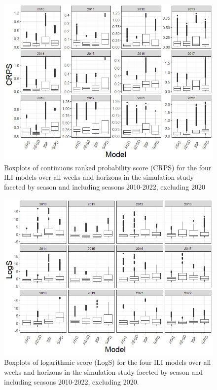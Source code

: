 \documentclass[ba]{imsart}
\theoremstyle{plain}
\theoremstyle{definition}
\theoremstyle{remark}
\begin{document}
\begin{supplement}
\begin{figure}[hbt!]
    \centering
    \includegraphics[scale=.5]{Images/crps_by_season.png}
    \caption{Boxplots of continuous ranked probability score (CRPS) for the four ILI models over all weeks and horizons in the simulation study faceted by season and including seasons 2010-2022, excluding 2020}
    \label{fig:crps_by_season}
\end{figure}



\begin{figure}[hbt!]
    \centering
    \includegraphics[scale=.5]{Images/logs_by_season.png}
    \caption{Boxplots of logarithmic score (LogS) for the four ILI models over all weeks and horizons in the simulation study faceted by season and including seasons 2010-2022, excluding 2020.}
    \label{fig:logs_by_season}
\end{figure}




\end{supplement}
\end{document}
